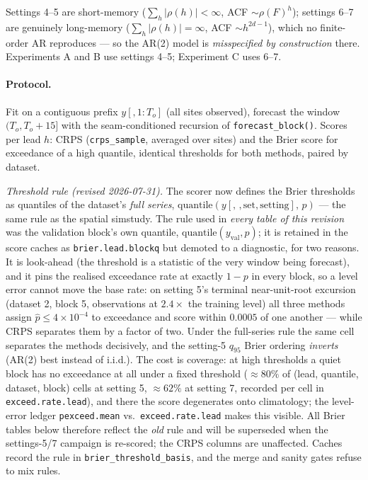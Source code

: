 \documentclass[11pt]{article}
\newcommand{\code}[1]{\texttt{#1}}
\begin{document}
\noindent Settings 4--5 are short-memory ($\sum_h |\rho(h)| < \infty$, ACF
$\sim \rho(F)^h$); settings 6--7 are genuinely long-memory
($\sum_h |\rho(h)| = \infty$, ACF $\sim h^{2d-1}$), which no finite-order AR
reproduces --- so the AR(2) model is \emph{misspecified by construction} there.
Experiments A and B use settings 4--5; Experiment C uses 6--7.

\paragraph{Protocol.} Fit on a contiguous prefix $y[, 1\!:\!T_o]$ (all sites
observed), forecast the window $(T_o, T_o + 15]$ with the seam-conditioned
recursion of \code{forecast\_block()}. Scores per lead $h$: CRPS
(\code{crps\_sample}, averaged over sites) and the Brier score for exceedance
of a high quantile, identical thresholds for both methods, paired by dataset.

\emph{Threshold rule (revised 2026-07-31).} The scorer now defines the Brier
thresholds as quantiles of the dataset's \emph{full series},
$\mathrm{quantile}(y[,\,,\mathrm{set},\mathrm{setting}],\,p)$ --- the same
rule as the spatial simstudy. The rule used in \emph{every table of this
revision} was the validation block's own quantile,
$\mathrm{quantile}(y_{\mathrm{val}},p)$; it is retained in the score caches
as \code{brier.lead.blockq} but demoted to a diagnostic, for two reasons.
It is look-ahead (the threshold is a statistic of the very window being
forecast), and it pins the realised exceedance rate at exactly $1-p$ in
every block, so a level error cannot move the base rate: on setting 5's
terminal near-unit-root excursion (dataset 2, block 5, observations at
$2.4\times$ the training level) all three methods assign
$\hat p \le 4\times10^{-4}$ to exceedance and score within $0.0005$ of one
another --- while CRPS separates them by a factor of two. Under the
full-series rule the same cell separates the methods decisively, and the
setting-5 $q_{95}$ Brier ordering \emph{inverts} (AR(2) best instead of
i.i.d.). The cost is coverage: at high thresholds a quiet block has no
exceedance at all under a fixed threshold ($\approx 80\%$ of
(lead, quantile, dataset, block) cells at setting 5, $\approx 62\%$ at
setting 7, recorded per cell in \code{exceed.rate.lead}), and there the
score degenerates onto climatology; the level-error ledger
\code{pexceed.mean} vs.\ \code{exceed.rate.lead} makes this visible. All
Brier tables below therefore reflect the \emph{old} rule and will be
superseded when the settings-5/7 campaign is re-scored; the CRPS columns
are unaffected. Caches record the rule in
\code{brier\_threshold\_basis}, and the merge and sanity gates refuse to
mix rules.
\end{document}
